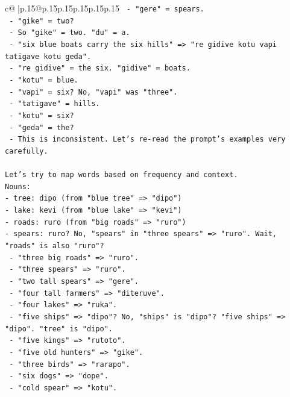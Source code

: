 \documentclass{article}
\begin{document}
{\begin{supertabular}{c@{$\;$}|p{.15\linewidth}@{}p{.15\linewidth}p{.15\linewidth}p{.15\linewidth}p{.15\linewidth}p{.15\linewidth}}
{{{\texttt{       {-} "gere" = spears.} \\
\texttt{       {-} "gike" = two?} \\
\texttt{     {-} So "gike" = two. "du" = a.} \\
\texttt{   {-} "six blue boats carry the six hills" => "re gidive kotu vapi tatigave kotu geda".} \\
\texttt{     {-} "re gidive" = the six. "gidive" = boats.} \\
\texttt{     {-} "kotu" = blue.} \\
\texttt{     {-} "vapi" = six? No, "vapi" was "three".} \\
\texttt{     {-} "tatigave" = hills.} \\
\texttt{     {-} "kotu" = six?} \\
\texttt{     {-} "geda" = the?} \\
\texttt{     {-} This is inconsistent. Let's re{-}read the prompt's examples very carefully.} \\
\\ 
\texttt{Let's try to map words based on frequency and context.} \\
\texttt{Nouns:} \\
\texttt{{-} tree: dipo (from "blue tree" => "dipo")} \\
\texttt{{-} lake: kevi (from "blue lake" => "kevi")} \\
\texttt{{-} roads: ruro (from "big roads" => "ruro")} \\
\texttt{{-} spears: ruro? No, "spears" in "three spears" => "ruro". Wait, "roads" is also "ruro"?} \\
\texttt{  {-} "three big roads" => "ruro".} \\
\texttt{  {-} "three spears" => "ruro".} \\
\texttt{  {-} "two tall spears" => "gere".} \\
\texttt{  {-} "four tall farmers" => "diteruve".} \\
\texttt{  {-} "four lakes" => "ruka".} \\
\texttt{  {-} "five ships" => "dipo"? No, "ships" is "dipo"? "five ships" => "dipo". "tree" is "dipo".} \\
\texttt{  {-} "five kings" => "rutoto".} \\
\texttt{  {-} "five old hunters" => "gike".} \\
\texttt{  {-} "three birds" => "rarapo".} \\
\texttt{  {-} "six dogs" => "dope".} \\
\texttt{  {-} "cold spear" => "kotu".} \\
}}}
\end{supertabular}}
\end{document}

